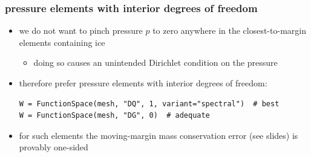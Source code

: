 \documentclass[10pt,
               hyperref={colorlinks,citecolor=DeepPink4,linkcolor=black,urlcolor=blue},
               svgnames]{beamer}
\newcommand{\detailreturn}[1]{\hfill \hyperlink{#1}{\beamerreturnbutton{return}}}
\begin{document}
\begin{frame}[label=dgonepressure,fragile]
\frametitle{pressure elements with interior degrees of freedom}

\begin{itemize}
\item we do \alert{not} want to pinch pressure $p$ to zero anywhere in the closest-to-margin elements containing ice
    \begin{itemize}
    \item[$\circ$] doing so causes an unintended Dirichlet condition on the pressure
    \end{itemize}
\item therefore prefer pressure elements with \alert{interior degrees of freedom}:

\medskip
\begin{Verbatim}[fontsize=\small,xleftmargin=0mm]
W = FunctionSpace(mesh, "DQ", 1, variant="spectral")  # best
W = FunctionSpace(mesh, "DG", 0)  # adequate
\end{Verbatim}

\medskip
\item for such elements the moving-margin mass conservation error (see slides) is provably one-sided
\end{itemize}

\detailreturn{techthreeb}
\end{frame}
\end{document}

